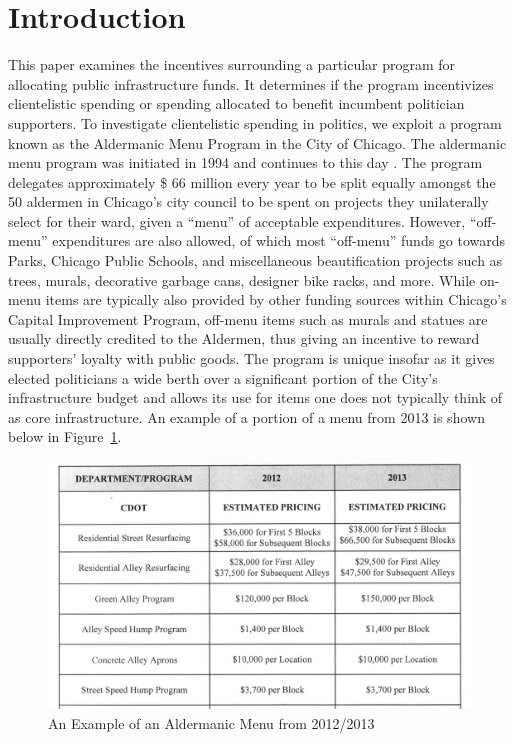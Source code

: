 \section*{Introduction}
This paper examines the incentives surrounding a particular program for allocating public infrastructure funds. It determines if the program incentivizes clientelistic spending or spending allocated to benefit incumbent politician supporters.
To investigate clientelistic spending in politics, we exploit a program known as the Aldermanic Menu Program in the City of Chicago. 
The aldermanic menu program was initiated in 1994 and continues to this day \cite{OIGaudit}. 
The program delegates approximately \$ 66 million every year to be split equally amongst the 50 aldermen in Chicago's city council to be spent on projects they unilaterally select for their ward, given a ``menu'' of acceptable expenditures. 
However, ``off-menu'' expenditures are also allowed, of which most ``off-menu'' funds go towards Parks, Chicago Public Schools, and miscellaneous beautification projects such as trees, murals, decorative garbage cans, designer bike racks, and more\cite{OIGaudit}. 
While on-menu items are typically also provided by other funding sources within Chicago's Capital Improvement Program, off-menu items such as murals and statues are usually directly credited to the Aldermen, thus giving an incentive to reward supporters' loyalty with public goods.
The program is unique insofar as it gives elected politicians a wide berth over a significant portion of the City's infrastructure budget and allows its use for items one does not typically think of as core infrastructure. 
An example of a portion of a menu from 2013 is shown below in Figure~\ref*{fig:menu_example}.


\begin{figure}[H]
    \centering
    \caption{An Example of an Aldermanic Menu from 2012/2013}\label{fig:menu_example}
    \includegraphics[scale=0.38]{input/menu_example.png}
\end{figure}

